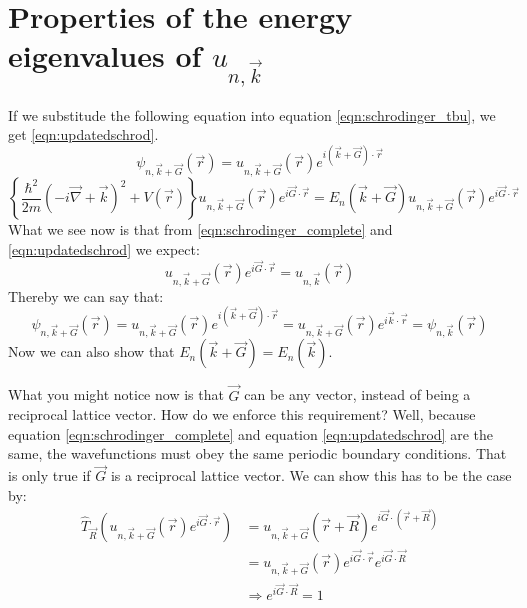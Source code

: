 \section{Properties of the energy eigenvalues of $u_{n, \vec{k}}$}
\begin{myproof}
	If we substitude the following equation into equation \ref{eqn:schrodinger_tbu}, we get \ref{eqn:updatedschrod}.
	\begin{equation}
		\psi_{n, \vec{k} + \vec{G}}(\vec{r}) = u_{n, \vec{k} + \vec{G}}(\vec{r})e^{i(\vec{k} + \vec{G})\cdot\vec{r}}
	\end{equation}
	\begin{equation}
		\left\{\frac{\hbar^2}{2m}\left(-i\vec{\nabla} + \vec{k}\right)^2 + V(\vec{r})\right\}u_{n, \vec{k} + \vec{G}}(\vec{r})e^{i\vec{G}\cdot\vec{r}} = E_n(\vec{k} + \vec{G})u_{n, \vec{k} + \vec{G}}(\vec{r})e^{i\vec{G}\cdot\vec{r}} \label{eqn:updatedschrod}
	\end{equation}
	What we see now is that from \ref{eqn:schrodinger_complete} and \ref{eqn:updatedschrod} we expect:
	\begin{equation}
		u_{n, \vec{k} + \vec{G}}(\vec{r})e^{i\vec{G}\cdot\vec{r}} = u_{n, \vec{k}}(\vec{r})
	\end{equation}
	Thereby we can say that:
	\begin{equation}
		\psi_{n, \vec{k} + \vec{G}}(\vec{r}) = u_{n, \vec{k} + \vec{G}}(\vec{r})e^{i(\vec{k} + \vec{G})\cdot\vec{r}} = u_{n, \vec{k} + \vec{G}}(\vec{r})e^{i\vec{k}\cdot\vec{r}} = \psi_{n, \vec{k}}(\vec{r})
	\end{equation}
	Now we can also show that $E_n(\vec{k} + \vec{G}) = E_n(\vec{k})$.
\end{myproof}
What you might notice now is that $\vec{G}$ can be any vector, instead of being a reciprocal lattice vector. How do we enforce this requirement? Well, because equation \ref{eqn:schrodinger_complete} and equation \ref{eqn:updatedschrod} are the same, the wavefunctions must obey the same periodic boundary conditions. That is only true if $\vec{G}$ is a reciprocal lattice vector.
We can show this has to be the case by:
\begin{align}
	\hat{T}_{\vec{R}}\left(u_{n, \vec{k} + \vec{G}}(\vec{r})e^{i\vec{G}\cdot\vec{r}}\right) &= u_{n, \vec{k} + \vec{G}}(\vec{r} + \vec{R})e^{i\vec{G}\cdot(\vec{r} + \vec{R})} \\
	&= u_{n, \vec{k} + \vec{G}}(\vec{r})e^{i\vec{G}\cdot\vec{r}}e^{i\vec{G}\cdot\vec{R}} \\
	&\Rightarrow e^{i\vec{G}\cdot\vec{R}} = 1
\end{align}

